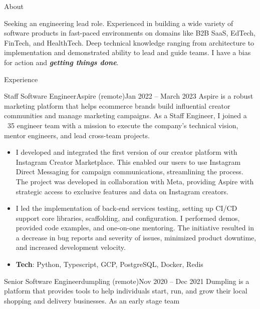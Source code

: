 \documentclass[colibri]{mcdowellcv}
\begin{document}
\makeheader
\begin{cvsection}{About}
  \begin{cvsubsection}{}{}{}
    Seeking an engineering lead role. Experienced in building a wide variety of
    software products in fast-paced environments on domains like B2B SaaS, EdTech,
    FinTech, and HealthTech. Deep technical knowledge ranging from architecture to
    implementation and demonstrated ability to lead and guide teams. I have a bias
    for action and \textbf{\textit{getting things done}}.
	\end{cvsubsection}
\end{cvsection}
\begin{cvsection}{Experience}
	\begin{cvsubsection}{Staff Software Engineer}{Aspire (remote)}{Jan 2022 -- March 2023}
    Aspire is a robust marketing platform that helps ecommerce brands build
    influential creator communities and manage marketing campaigns. As a Staff
    Engineer, I joined a ~35 engineer team with a mission to execute the company's
    technical vision, mentor engineers, and lead cross-team projects.
		\begin{itemize}
    \item
      I developed and integrated the first version of our creator platform with
      Instagram Creator Marketplace. This enabled our users to use Instagram
      Direct Messaging for campaign communications, streamlining the
      process. The project was developed in collaboration with Meta, providing
      Aspire with strategic access to exclusive features and data on Instagram
      creators.
    \item
      I led the implementation of back-end services testing, setting up CI/CD
      support core libraries, scaffolding, and configuration. I performed demos,
      provided code examples, and one-on-one mentoring. The initiative resulted
      in a decrease in bug reports and severity of issues, minimized product
      downtime, and increased development velocity.
    \item \textbf{Tech}: Python, Typescript, GCP, PostgreSQL, Docker, Redis
		\end{itemize}
  \end{cvsubsection}
	\begin{cvsubsection}{Senior Software Engineer}{dumpling (remote)}{Nov 2020 -- Dec 2021}
    Dumpling is a platform that provides tools to help individuals start, run, and
    grow their local shopping and delivery businesses. As an early stage team

\end{cvsubsection}
\end{cvsection}
\end{document}
